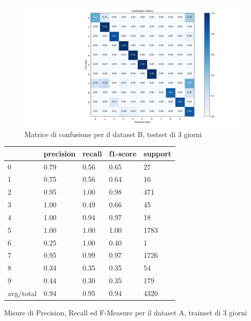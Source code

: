 \documentclass[10pt,a4paper]{article}
\begin{document}
	\begin{figure}[!htbp]
	\includegraphics[width=\linewidth]{immagini/confusion_matrix/b_3d.png}
	\caption{Matrice di confusione per il dataset B, testset di 3 giorni}
	\label{fig:b_3d}
	\end{figure}


	\begin{table}[!htbp]
    \scriptsize
    \centering
    	\begin{tabularx}{0.56\textwidth}{l | llll}
    		{} & {precision} & {recall} & {f1-score} & {support} \\
    		\midrule
            {0} & {0.79} & {0.56} & {0.65} & {27} \\
            {1} & {0.75} & {0.56} & {0.64} & {16} \\
            {2} & {0.95} & {1.00} & {0.98} & {471} \\
            {3} & {1.00} & {0.49} & {0.66} & {45} \\
            {4} & {1.00} & {0.94} & {0.97} & {18} \\
            {5} & {1.00} & {1.00} & {1.00} & {1783} \\
            {6} & {0.25} & {1.00} & {0.40} & {1} \\
            {7} & {0.95} & {0.99} & {0.97} & {1726} \\
            {8} & {0.34} & {0.35} & {0.35} & {54} \\
            {9} & {0.44} & {0.30} & {0.35} & {179} \\
            {avg/total} & {0.94} & {0.95} & {0.94} & {4320} \\
    	\end{tabularx}
    	 {Misure di Precision, Recall ed F-Measure per il dataset A, trainset di 3 giorni}
    	\label{tab:a_3d}
    \end{table}
\end{document}
